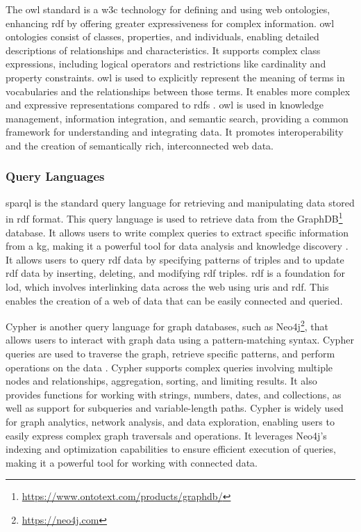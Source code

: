 The \gls{owl} standard is a \gls{w3c} technology for defining and using web ontologies, enhancing \gls{rdf} by offering greater expressiveness for complex information. \gls{owl} ontologies consist of classes, properties, and individuals, enabling detailed descriptions of relationships and characteristics. It supports complex class expressions, including logical operators and restrictions like cardinality and property constraints.
\gls{owl} is used to explicitly represent the meaning of terms in vocabularies and the relationships between those terms. It enables more complex and expressive representations compared to \gls{rdfs} \cite{Deborah2004}.
\gls{owl} is used in knowledge management, information integration, and semantic search, providing a common framework for understanding and integrating data. It promotes interoperability and the creation of semantically rich, interconnected web data.

\subsubsection*{Query Languages}
\gls{sparql} is the standard query language for retrieving and manipulating data stored in \gls{rdf} format.
This query language is used to retrieve data from the GraphDB\footnote{\url{https://www.ontotext.com/products/graphdb/}} database.
It allows users to write complex queries to extract specific information from a \gls{kg}, making it a powerful tool for data analysis and knowledge discovery \cite{Jorge2009}.
It allows users to query \gls{rdf} data by specifying patterns of triples and to update \gls{rdf} data by inserting, deleting, and modifying \gls{rdf} triples.
\gls{rdf} is a foundation for \gls{lod}, which involves interlinking data across the web using \glspl{uri} and \gls{rdf}. This enables the creation of a web of data that can be easily connected and queried.

Cypher is another query language for graph databases, such as Neo4j\footnote{\url{https://neo4j.com}}, that allows users to interact with graph data using a pattern-matching syntax. Cypher queries are used to traverse the graph, retrieve specific patterns, and perform operations on the data \cite{Francis2018}.
Cypher supports complex queries involving multiple nodes and relationships, aggregation, sorting, and limiting results. It also provides functions for working with strings, numbers, dates, and collections, as well as support for subqueries and variable-length paths.
Cypher is widely used for graph analytics, network analysis, and data exploration, enabling users to easily express complex graph traversals and operations. It leverages Neo4j's indexing and optimization capabilities to ensure efficient execution of queries, making it a powerful tool for working with connected data.

